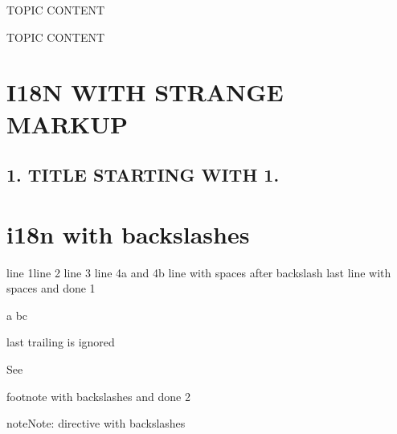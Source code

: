 \documentclass[letterpaper,10pt,english]{sphinxmanual}
\begin{document}
\begin{sphinxtopic}

\sphinxAtStartPar
TOPIC CONTENT
\end{sphinxtopic}

\begin{sphinxtopic}

\sphinxAtStartPar
TOPIC CONTENT
\end{sphinxtopic}

\sphinxstepscope


\chapter{I18N WITH STRANGE MARKUP}
\label{\detokenize{markup:i18n-with-strange-markup}}\label{\detokenize{markup::doc}}

\section{1. TITLE STARTING WITH 1.}
\label{\detokenize{markup:title-starting-with-1}}
\sphinxstepscope


\chapter{i18n with backslashes}
\label{\detokenize{backslashes:i18n-with-backslashes}}\label{\detokenize{backslashes::doc}}
\sphinxAtStartPar
line 1line 2 line 3  line 4a and 4b line       with spaces after backslash     last line       with spaces     and done 1

\sphinxAtStartPar
a bc   

\sphinxAtStartPar
last trailing is ignored

\sphinxAtStartPar
See %
\begin{footnote}[1]\sphinxAtStartFootnote
footnote with backslashes and done 2
%
\end{footnote}

\begin{sphinxadmonition}{note}{Note:}
\sphinxAtStartPar
directive with backslashes
\end{sphinxadmonition}

\begin{fulllineitems}
\label{\detokenize{backslashes:foo}}
\pysigstartsignatures
\pysiglinewithargsret
{}
{\sphinxparamcomma {}\sphinxparamcomma {}\sphinxparamcomma {}\sphinxparamcomma {}\sphinxparamcomma {}}
{}
\pysigline
{}
\pysigstopsignatures
\end{fulllineitems}
\end{document}
